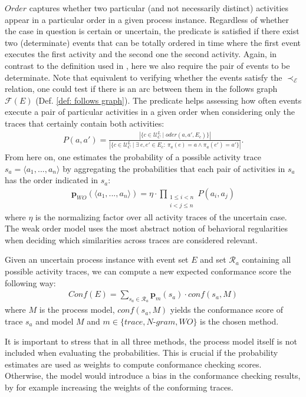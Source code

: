 $Order$
captures whether two particular (and not necessarily distinct) activities appear in a particular order in a given process instance.
Regardless of whether the case in question is certain or uncertain, the predicate is satisfied if there exist two (determinate) events that can be totally ordered in time where the first event executes the first activity and the second one the second activity.
Again, in contrast to the definition used in \cite{por}, here we also require the pair of events to be determinate.
Note that equivalent to verifying whether the events satisfy the $\prec_{\mathcal{E}}$ relation, one could test if there is an arc between them in the follows graph $\mathcal{F}(E)$ (Def. \ref{def: follows graph}).
The predicate helps assessing how often events execute a pair of particular activities in a given order when considering only the traces that certainly contain both activities:
\begin{align*}
P(a,a')= \frac{|\{c \in \mathcal{U}_C^L \mid oder(a,a',E_c)\}|}
{|\{c \in \mathcal{U}_C^L \mid \exists ~ e,e' \in E_c: ~
\pi_a(e)=a \wedge \pi_a(e')=a'\}|}.
\end{align*}
From here on, one estimates the probability of a possible activity trace $s_a=\langle a_1,...,a_n \rangle$ by aggregating the probabilities that each pair of activities in $s_a$ has the order indicated in $s_a$:
\begin{align*}
\textbf{p}_{WO}(\langle a_1,...,a_n \rangle) = \eta \cdot \prod_{
\substack{1 \leq i < n \\ i < j \leq n}}
P(a_i,a_j)
\end{align*}
where $\eta$ is the normalizing factor over all activity traces of the uncertain case.
The weak order model uses the most abstract notion of behavioral regularities when deciding which similarities across traces are considered relevant.

Given an uncertain process instance with event set $E$ and set $\mathcal{R}_a$ containing all possible activity traces, we can compute a new expected conformance score the following way:
\begin{align*}
Conf(E) = \sum_{s_a \in \mathcal{R}_a} \textbf{p}_m(s_a) \cdot conf(s_a,M)
\end{align*}
where $M$ is the process model, $conf(s_a,M)$ yields the conformance score of trace $s_a$ and model $M$ and $m \in \{trace, N$-$gram, WO\}$ is the chosen method.

It is important to stress that in all three methods, the process model itself is not included when evaluating the probabilities.
This is crucial if the probability estimates are used as weights to compute conformance checking scores.
Otherwise, the model would introduce a bias in the conformance checking results, by for example increasing the weights of the conforming traces.

